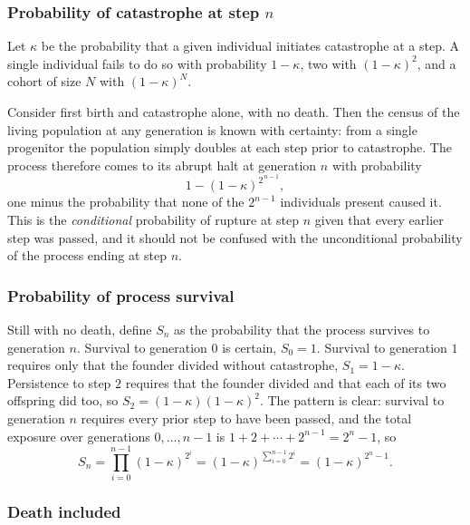 \subsubsection*{Probability of catastrophe at step \texorpdfstring{$n$}{n}}

Let $\kappa$ be the probability that a given individual initiates catastrophe at a
step. A single individual fails to do so with probability $1-\kappa$, two with
$(1-\kappa)^2$, and a cohort of size $N$ with $(1-\kappa)^N$.

Consider first birth and catastrophe alone, with no death. Then the census of the
living population at any generation is known with certainty: from a single
progenitor the population simply doubles at each step prior to catastrophe. The
process therefore comes to its abrupt halt at generation $n$ with probability
\begin{equation}
\label{m:eq:bdchalt}
1-(1-\kappa)^{2^{\,n-1}},
\end{equation}
one minus the probability that none of the $2^{n-1}$ individuals present caused it.
This is the \emph{conditional} probability of rupture at step $n$ given that every
earlier step was passed, and it should not be confused with the unconditional
probability of the process ending at step $n$.

\subsubsection*{Probability of process survival}

Still with no death, define $S_n$ as the probability that the process survives to
generation $n$. Survival to generation $0$ is certain, $S_0=1$. Survival to
generation $1$ requires only that the founder divided without catastrophe,
$S_1=1-\kappa$. Persistence to step $2$ requires that the founder divided and that
each of its two offspring did too, so $S_2 = (1-\kappa)(1-\kappa)^2$. The pattern
is clear: survival to generation $n$ requires every prior step to have been passed,
and the total exposure over generations $0,\dots,n-1$ is
$1+2+\cdots+2^{n-1} = 2^n-1$, so
\begin{equation}
\label{m:eq:bdcS}
S_n = \prod_{i=0}^{n-1}(1-\kappa)^{2^i}
= (1-\kappa)^{\sum_{i=0}^{n-1}2^i}
= (1-\kappa)^{2^n-1} .
\end{equation}

\subsubsection*{Death included}

